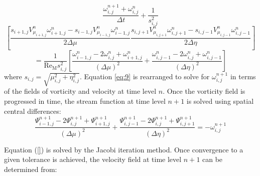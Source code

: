 \documentclass{article}
\begin{document}
\[
\frac{\omega^{n+1}_{i,j}+\omega^n_{i,j}}{\Delta t} + \frac{1}{s^2_{i,j}}
\]
\[
\left[
\frac{s_{i+1,j}V^n_{\mu_{i+1,j}}\omega^n_{i+1,j}-s_{i-1,j}V^n_{\mu_{i-1,j}}\omega^n_{i-1,j}}
     {2\Delta\mu}
\frac{s_{i,j+1}V^n_{\mu_{i,j+1}}\omega^n_{i,j+1}-s_{i,j-1}V^n_{\mu_{i,j-1}}\omega^n_{i,j-1}}
     {2\Delta\eta}
\right]
\]
\begin{equation}
\label{eq:9}
=\frac{1}{\text{Re}_\text{M}s^2_{i,j}}
\left[
\frac{\omega^n_{i-1,j}-2\omega^n_{i,j}+\omega^n_{i+1,j}}{(\Delta\mu)^2}
+
\frac{\omega^n_{i,j-1}-2\omega^n_{i,j}+\omega^n_{i,j-1}}{(\Delta\eta)^2}
\right]
\end{equation}
where $s_{i,j}=\sqrt{\mu^2_{i,j}+\eta^2_{i,j}}$.
Equation \ref{eq:9} is rearranged to solve for $\omega^{n+1}_{i,j}$ in terms of the fields of
vorticity and velocity at time level $n$.
Once the vorticity field is progressed in time, the stream
function at time level $n+1$ is solved using spatial central differences:
\begin{equation}
\frac{\Psi^{n+1}_{i-1,j}-2\Psi^{n+1}_{i,j}+\Psi^{n+1}_{i+1,j}}{(\Delta\mu)^2}+
\frac{\Psi^{n+1}_{i,j-1}-2\Psi^{n+1}_{i,j}+\Psi^{n+1}_{i,j+1}}{(\Delta\eta)^2}
=-\omega^{n+1}_{i,j}
\end{equation}

Equation (\ref{}) is solved by the Jacobi iteration method. Once convergence to a given tolerance is achieved, the velocity field at time level $n+1$ can be determined from:
\end{document}
